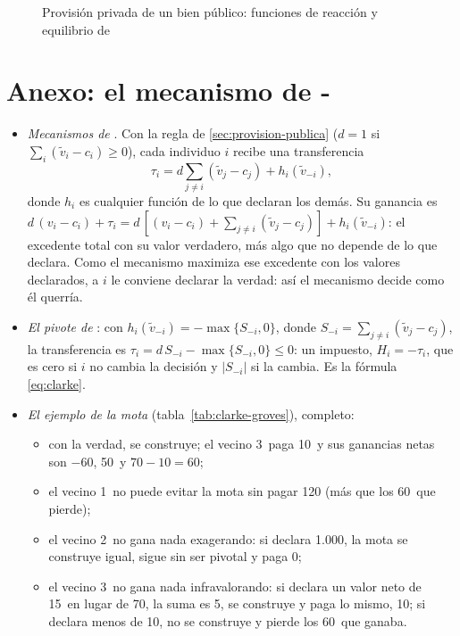\documentclass[11pt]{article}
\begin{document}
\begin{figure}[H]
\centering
\caption{Provisión privada de un bien público: funciones de reacción y equilibrio de }\label{fig:provision-privada}
\end{figure}

\section{Anexo: el mecanismo de -}\label{anexo:clarke-groves}

\begin{itemize}
\item \emph{Mecanismos de }. Con la regla de \ref{sec:provision-publica} ($d=1$ si $\sum_i(\tilde{v}_i-c_i)\geq0$), cada individuo $i$ recibe una transferencia
  $$\tau_i=d\sum_{j\neq i}(\tilde{v}_j-c_j)+h_i(\tilde{v}_{-i}),$$
  donde $h_i$ es cualquier función de lo que declaran los demás. Su ganancia es $d\,(v_i-c_i)+\tau_i=d\,\left[(v_i-c_i)+\sum_{j\neq i}(\tilde{v}_j-c_j)\right]+h_i(\tilde{v}_{-i})$: el excedente total con su valor verdadero, más algo que no depende de lo que declara. Como el mecanismo maximiza ese excedente con los valores declarados, a $i$ le conviene declarar la verdad: así el mecanismo decide como él querría\nocite{Groves1973Incentives}.~\findemo
\item \emph{El pivote de }: con $h_i(\tilde{v}_{-i})=-\max\{S_{-i},0\}$, donde $S_{-i}=\sum_{j\neq i}(\tilde{v}_j-c_j)$, la transferencia es $\tau_i=d\,S_{-i}-\max\{S_{-i},0\}\leq0$: un impuesto, $H_i=-\tau_i$, que es cero si $i$ no cambia la decisión y $|S_{-i}|$ si la cambia\nocite{Clarke1971Multipart}. Es la fórmula \eqref{eq:clarke}.
\item \emph{El ejemplo de la mota} (tabla~\ref{tab:clarke-groves}), completo:
  \begin{itemize}
  \item con la verdad, se construye; el vecino 3~paga 10~y sus ganancias netas son $-60$, 50~y $70-10=60$;
  \item el vecino 1~no puede evitar la mota sin pagar 120 (más que los 60~que pierde);
  \item el vecino 2~no gana nada exagerando: si declara 1.000, la mota se construye igual, sigue sin ser pivotal y paga 0;
  \item el vecino 3~no gana nada infravalorando: si declara un valor neto de 15~en lugar de 70, la suma es 5, se construye y paga lo mismo, 10; si declara menos de 10, no se construye y pierde los 60~que ganaba.

\end{itemize}
\end{itemize}
\end{document}
